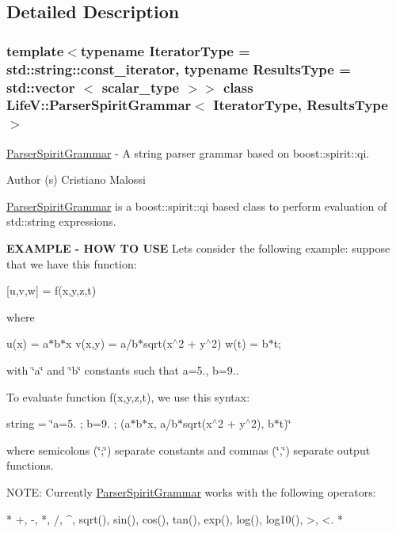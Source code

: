 \subsection{Detailed Description}
\subsubsection*{template$<$typename Iterator\+Type = std\+::string\+::const\+\_\+iterator, typename Results\+Type = std\+::vector $<$ scalar\+\_\+type $>$$>$\newline
class Life\+V\+::\+Parser\+Spirit\+Grammar$<$ Iterator\+Type, Results\+Type $>$}

\hyperlink{classLifeV_1_1ParserSpiritGrammar}{Parser\+Spirit\+Grammar} -\/ A string parser grammar based on {\ttfamily boost\+::spirit\+::qi}. 

\begin{DoxyAuthor}{Author}
(s) Cristiano Malossi
\end{DoxyAuthor}
{\ttfamily \hyperlink{classLifeV_1_1ParserSpiritGrammar}{Parser\+Spirit\+Grammar}} is a {\ttfamily boost\+::spirit\+::qi} based class to perform evaluation of {\ttfamily std\+::string} expressions.

{\bfseries E\+X\+A\+M\+P\+LE -\/ H\+OW TO U\+SE} Let\textquotesingle{}s consider the following example\+: suppose that we have this function\+:

\mbox{[}u,v,w\mbox{]} = f(x,y,z,t)

where

u(x) = a$\ast$b$\ast$x v(x,y) = a/b$\ast$sqrt(x$^\wedge$2 + y$^\wedge$2) w(t) = b$\ast$t;

with \char`\"{}a\char`\"{} and \char`\"{}b\char`\"{} constants such that a=5., b=9..

To evaluate function f(x,y,z,t), we use this syntax\+:

string = \char`\"{}a=5. ; b=9. ; (a$\ast$b$\ast$x, a/b$\ast$sqrt(x$^\wedge$2 + y$^\wedge$2), b$\ast$t)\char`\"{}

where semicolons (\char`\"{};\char`\"{}) separate constants and commas (\char`\"{},\char`\"{}) separate output functions.

N\+O\+TE\+: Currently \hyperlink{classLifeV_1_1ParserSpiritGrammar}{Parser\+Spirit\+Grammar} works with the following operators\+: \begin{DoxyVerb}*  +, -, *, /, ^, sqrt(), sin(), cos(), tan(), exp(), log(), log10(), >, <.
*  \end{DoxyVerb}
 

